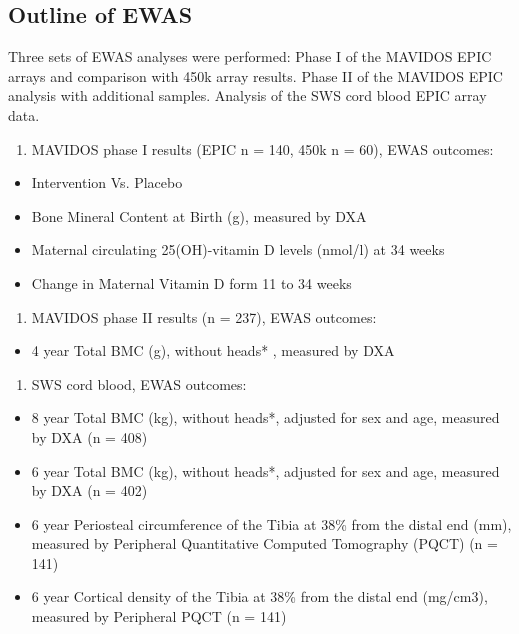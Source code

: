\documentclass[
]{book}
\providecommand{\tightlist}{%
  \setlength{\itemsep}{0pt}\setlength{\parskip}{0pt}}
\begin{document}
\hypertarget{outline-of-ewas}{%
\subsection{Outline of EWAS}\label{outline-of-ewas}}

Three sets of EWAS analyses were performed:
Phase I of the MAVIDOS EPIC arrays and comparison with 450k array results.
Phase II of the MAVIDOS EPIC analysis with additional samples.
Analysis of the SWS cord blood EPIC array data.

\begin{enumerate}
\def\labelenumi{\arabic{enumi}.}
\tightlist
\item
  MAVIDOS phase I results (EPIC n = 140, 450k n = 60), EWAS outcomes:
\end{enumerate}

\begin{itemize}
\tightlist
\item
  Intervention Vs. Placebo
\item
  Bone Mineral Content at Birth (g), measured by DXA
\item
  Maternal circulating 25(OH)-vitamin D levels (nmol/l) at 34 weeks
\item
  Change in Maternal Vitamin D form 11 to 34 weeks
\end{itemize}

\begin{enumerate}
\def\labelenumi{\arabic{enumi}.}
\setcounter{enumi}{1}
\tightlist
\item
  MAVIDOS phase II results (n = 237), EWAS outcomes:
\end{enumerate}

\begin{itemize}
\tightlist
\item
  4 year Total BMC (g), without heads* , measured by DXA
\end{itemize}

\begin{enumerate}
\def\labelenumi{\arabic{enumi}.}
\setcounter{enumi}{2}
\tightlist
\item
  SWS cord blood, EWAS outcomes:
\end{enumerate}

\begin{itemize}
\tightlist
\item
  8 year Total BMC (kg), without heads*, adjusted for sex and age, measured by DXA (n = 408)
\item
  6 year Total BMC (kg), without heads*, adjusted for sex and age, measured by DXA (n = 402)
\item
  6 year Periosteal circumference of the Tibia at 38\% from the distal end (mm), measured by Peripheral Quantitative Computed Tomography (PQCT) (n = 141)
\item
  6 year Cortical density of the Tibia at 38\% from the distal end (mg/cm3), measured by Peripheral PQCT (n = 141)
\end{itemize}
\end{document}
